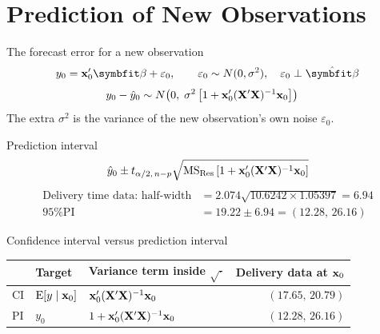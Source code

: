 \section{Prediction of New Observations}


\begin{frame}{The forecast error for a new observation}
    \begin{align*}
        y_0 = \bx_0'\bbeta + \varepsilon_0, \qquad \varepsilon_0 \sim N(0,\sigma^2), \quad \varepsilon_0 \perp \hat{\bbeta}
    \end{align*}
    \begin{align*}
        y_0 - \hat y_0 &\sim N\!\left(0,\; \sigma^2\left[1 + \mathbf{x}_0'(\mathbf{X}'\mathbf{X})^{-1}\mathbf{x}_0\right]\right)
    \end{align*}
    The extra $\sigma^2$ is the variance of the new observation's own noise $\varepsilon_0$.
\end{frame}


\begin{frame}{Prediction interval}
    \begin{align*}
        \hat y_0 \pm t_{\alpha/2,\,n-p}\sqrt{\mathrm{MS}_{\mathrm{Res}}\left[1 + \mathbf{x}_0'(\mathbf{X}'\mathbf{X})^{-1}\mathbf{x}_0\right]}
    \end{align*}
    \begin{align*}
        \text{Delivery time data: half-width} &= 2.074\sqrt{10.6242 \times 1.05397} = 6.94 \\
        \text{95\% PI} &= 19.22 \pm 6.94 = (12.28,\, 26.16)
    \end{align*}
\end{frame}


\begin{frame}{Confidence interval versus prediction interval}
    \begin{center}
        \begin{tabular}{lllr}
            \toprule
             & Target & Variance term inside $\sqrt{\cdot}$ & Delivery data at $\mathbf{x}_0$ \\
            \midrule
            CI & $\operatorname{E}[y \mid \mathbf{x}_0]$ & $\mathbf{x}_0'(\mathbf{X}'\mathbf{X})^{-1}\mathbf{x}_0$ & $(17.65,\, 20.79)$ \\
            PI & $y_0$ & $1 + \mathbf{x}_0'(\mathbf{X}'\mathbf{X})^{-1}\mathbf{x}_0$ & $(12.28,\, 26.16)$ \\
            \bottomrule
        \end{tabular}
    \end{center}
\end{frame}


